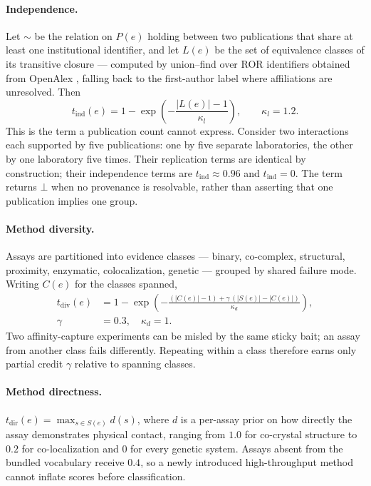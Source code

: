 \documentclass[conference]{IEEEtran}
\begin{document}
\paragraph{Independence.} Let $\sim$ be the relation on $P(e)$ holding between two
publications that share at least one institutional identifier, and let $L(e)$ be the
set of equivalence classes of its transitive closure --- computed by union--find over
ROR identifiers obtained from OpenAlex \cite{openalex}, falling back to the first-author
label where affiliations are unresolved. Then
\begin{equation}
  t_{\mathrm{ind}}(e) = 1 - \exp\!\left(-\frac{|L(e)| - 1}{\kappa_l}\right),
  \qquad \kappa_l = 1.2 .
\end{equation}
This is the term a publication count cannot express. Consider two interactions each
supported by five publications: one by five separate laboratories, the other by one
laboratory five times. Their replication terms are identical by construction; their
independence terms are $t_{\mathrm{ind}} \approx 0.96$ and $t_{\mathrm{ind}} = 0$. The
term returns $\bot$ when no provenance is resolvable, rather than asserting that one
publication implies one group.

\paragraph{Method diversity.} Assays are partitioned into evidence classes --- binary,
co-complex, structural, proximity, enzymatic, colocalization, genetic --- grouped by
shared failure mode. Writing $C(e)$ for the classes spanned,
\begin{equation}
  \begin{split}
    t_{\mathrm{div}}(e) &= 1 - \exp\!\left(
      -\frac{(|C(e)| - 1) + \gamma\,(|S(e)| - |C(e)|)}{\kappa_d}\right), \\
    \gamma &= 0.3, \quad \kappa_d = 1 .
  \end{split}
\end{equation}
Two affinity-capture experiments can be misled by the same sticky bait; an assay from
another class fails differently. Repeating within a class therefore earns only partial
credit $\gamma$ relative to spanning classes.

\paragraph{Method directness.} $t_{\mathrm{dir}}(e) = \max_{s \in S(e)} d(s)$, where
$d$ is a per-assay prior on how directly the assay demonstrates physical contact,
ranging from $1.0$ for co-crystal structure to $0.2$ for co-localization and $0$ for
every genetic system. Assays absent from the bundled vocabulary receive $0.4$, so a
newly introduced high-throughput method cannot inflate scores before classification.
\end{document}
